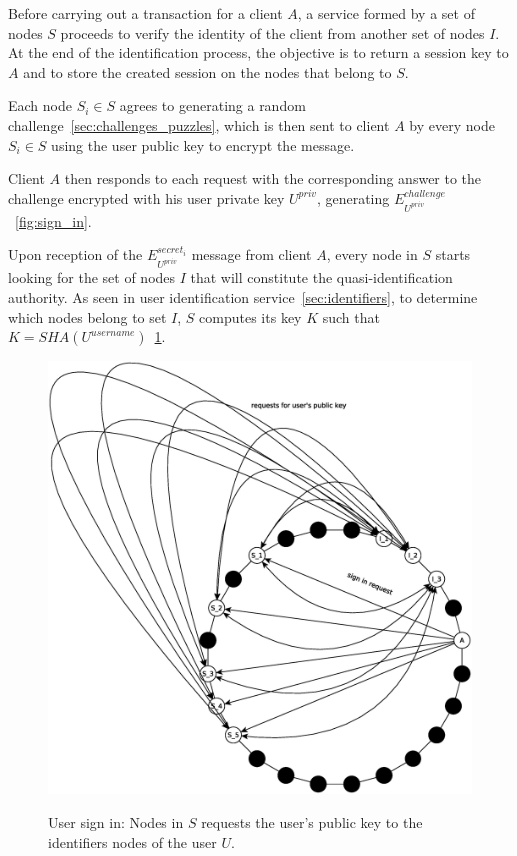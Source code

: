 Before carrying out a transaction for a client $A$, a service formed by a set of nodes $S$ proceeds to
verify the identity of the client from another set of nodes $I$. At the end of
the identification process, the objective is to return a session key to $A$
and to store the created session on the nodes that belong to $S$.

Each node $S_i \in S$ agrees to generating a random challenge~\ref{sec:challenges_puzzles}, which is then sent to
client $A$ by every node $S_i \in S$ using the user public key to encrypt the
message.

Client $A$ then responds to each request with the corresponding answer to the
challenge encrypted with his user private key $U^{priv}$, generating
$E^{challenge}_{U^{priv}}$~\ref{fig:sign_in}. 

Upon reception of the $E^{secret_i}_{U^{priv}}$ message from client $A$, every node in $S$
starts looking for the set of nodes $I$ that will constitute the
quasi-identification authority. As seen in user identification
service~\ref{sec:identifiers}, to determine which nodes belong to set $I$, $S$ computes
its key $K$ such that $K = SHA(U^{username})$~\ref{fig:sign_in_2}.

\begin{figure}[!htb]
\centering
\includegraphics[width=14cm]{../img/sign_in_2}\\
\caption{User sign in: Nodes in $S$ requests the user's public key to the
identifiers nodes of the user $U$.}
\label{fig:sign_in_2}
\end{figure}

